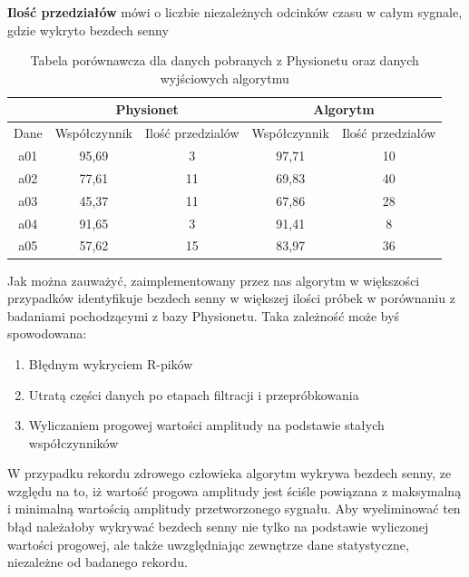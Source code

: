 \textbf{Ilość przedziałów} mówi o liczbie niezależnych odcinków czasu w całym sygnale, gdzie wykryto bezdech senny

\begin{table}[!ht]
  \centering
  \begin{tabular}{|c|c|c|c|c|}
    \hline
  &\multicolumn{2}{|c|}{Physionet}&\multicolumn{2}{|c|}{Algorytm} \\
    \hline
Dane&Współczynnik&Ilość przedzialów&Współczynnik&Ilość przedzialów \\
    \hline
    a01 & 95,69 & 3 & 97,71 & 10 \\
    a02 & 77,61 & 11 &  69,83 & 40 \\
    a03 & 45,37 & 11 &  67,86 & 28 \\
    a04 & 91,65 & 3 & 91,41 & 8 \\
    a05 & 57,62 & 15 & 83,97 & 36 \\
    \hline
  \end{tabular}
\caption{Tabela porównawcza dla danych pobranych z Physionetu oraz danych wyjściowych algorytmu }
\end{table}
Jak można zauważyć, zaimplementowany przez nas algorytm w większości przypadków identyfikuje bezdech senny w większej ilości próbek w porównaniu z badaniami pochodzącymi z bazy Physionetu. Taka zależność może byś spowodowana:
\begin{enumerate}
 \item Błędnym wykryciem R-pików
 \item Utratą części danych po etapach filtracji i przepróbkowania
 \item Wyliczaniem progowej wartości amplitudy na podstawie stałych współczynników
\end{enumerate}

W przypadku rekordu zdrowego człowieka algorytm wykrywa bezdech senny, ze względu na to, iż wartość progowa amplitudy jest ściśle powiązana z maksymalną i minimalną wartością amplitudy przetworzonego sygnału. Aby wyeliminować ten błąd należałoby wykrywać bezdech senny nie tylko na podstawie wyliczonej wartości progowej, ale także uwzględniając zewnętrze dane statystyczne, niezależne od badanego rekordu.
